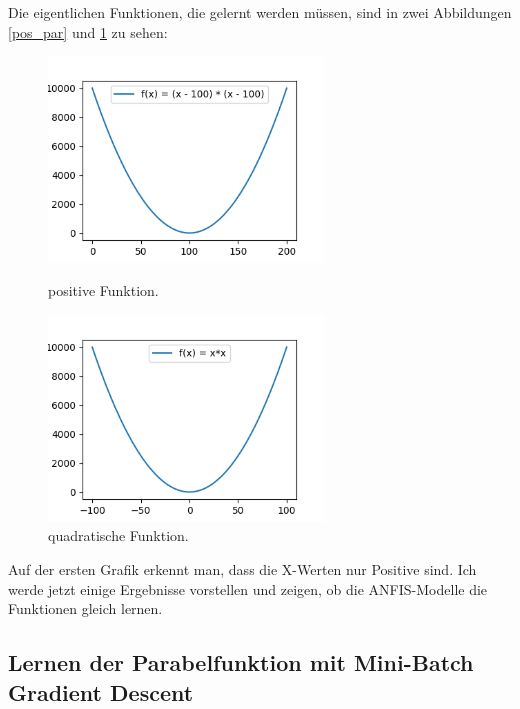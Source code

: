 {Die eigentlichen Funktionen, die gelernt werden müssen, sind in zwei Abbildungen \ref{pos_par} und \ref{par} zu sehen:
\begin{figure}
	\begin{minipage}{0.48\textwidth}
		\centering
		\includegraphics[width=0.65\textwidth]{images/parabola_positive.png}
		\caption{positive Funktion.}
		\label{pos_par}
	\end{minipage} \hfill
	\begin{minipage}{0.48\textwidth}
		\centering
		\includegraphics[width=0.65\textwidth]{images/parabola.png}
		\caption{quadratische Funktion.}
		\label{par}
	\end{minipage}
\end{figure}

Auf der ersten Grafik erkennt man, dass die X-Werten nur Positive sind. Ich werde jetzt einige Ergebnisse vorstellen und zeigen, ob die ANFIS-Modelle die Funktionen gleich lernen.

\subsection{Lernen der Parabelfunktion mit Mini-Batch Gradient Descent}

}
